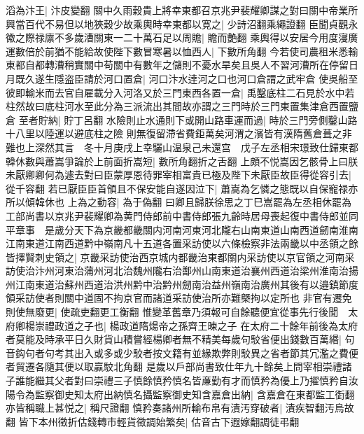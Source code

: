 滔為汴王|{
	汴皮變翻}
關中久雨穀貴上將幸東都召京兆尹裴耀卿謀之對曰關中帝業所興當百代不易但以地狹穀少故乘輿時幸東都以寛之|{
	少詩沼翻乘繩證翻}
臣聞貞觀永徽之際禄廪不多歲漕關東一二十萬石足以周贍|{
	贍而艶翻}
乘輿得以安居今用度寖廣運數倍於前猶不能給故使陛下數冒寒暑以恤西人|{
	下數所角翻}
今若使司農租米悉輸東都自都轉漕稍實關中苟關中有數年之儲則不憂水旱矣且吳人不習河漕所在停留日月既久遂生隱盗臣請於河口置倉|{
	河口汴水逹河之口也河口倉謂之武牢倉}
使吳船至彼即輸米而去官自雇載分入河洛又於三門東西各置一倉|{
	禹鑿底柱二石見於水中若柱然故曰底柱河水至此分為三派流出其間故亦謂之三門時於三門東置集津倉西置鹽倉}
至者貯納|{
	貯丁呂翻}
水險則止水通則下或開山路車運而過|{
	時於三門旁側鑿山路十八里以陸運以避底柱之險}
則無復留滯省費鉅萬矣河渭之濱皆有漢隋舊倉葺之非難也上深然其言　冬十月庚戌上幸驪山温泉己未還宫　戊子左丞相宋璟致仕歸東都　韓休數與蕭嵩爭論於上前面折嵩短|{
	數所角翻折之舌翻}
上頗不悦嵩因乞骸骨上曰朕未厭卿卿何為遽去對曰臣蒙厚恩待罪宰相富貴已極及陛下未厭臣故臣得從容引去|{
	從千容翻}
若已厭臣臣首領且不保安能自遂因泣下|{
	蕭嵩為乞憐之態既以自保寵禄亦所以傾韓休也}
上為之動容|{
	為于偽翻}
曰卿且歸朕徐思之丁巳嵩罷為左丞相休罷為工部尚書以京兆尹裴耀卿為黄門侍郎前中書侍郎張九齡時居母喪起復中書侍郎並同平章事　是歲分天下為京畿都畿關内河南河東河北隴右山南東道山南西道劒南淮南江南東道江南西道黔中嶺南凡十五道各置采訪使以六條檢察非法兩畿以中丞領之餘皆擇賢刺史領之|{
	京畿采訪使治西京城内都畿治東都關内采訪使以京官領之河南采訪使治汴州河東治蒲州河北治魏州隴右治鄯州山南東道治襄州西道治梁州淮南治揚州江南東道治蘇州西道治洪州黔中治黔州劒南治益州嶺南治廣州其後有以邉鎮節度領采訪使者則關中道固不拘京官而諸道采訪使治所亦難槩拘以定所也}
非官有遷免則使無廢更|{
	使疏吏翻更工衡翻}
惟變革舊章乃須報可自餘聽便宜從事先行後聞　太府卿楊崇禮政道之子也|{
	楊政道隋煬帝之孫齊王暕之子}
在太府二十餘年前後為太府者莫能及時承平日久財貨山積嘗經楊卿者無不精美每歲句駮省便出錢數百萬緡|{
	句音鈎句者句考其出入或多或少駮者按文籍有並緣欺弊則駮異之省者節其冗濫之費便者貿遷各隨其便以取贏駮北角翻}
是歲以戶部尚書致仕年九十餘矣上問宰相崇禮諸子誰能繼其父者對曰崇禮三子慎餘慎矜慎名皆亷勤有才而慎矜為優上乃擢慎矜自汝陽令為監察御史知太府出納慎名攝監察御史知含嘉倉出納|{
	含嘉倉在東都監工衘翻}
亦皆稱職上甚悦之|{
	稱尺證翻}
慎矜奏諸州所輸布帛有漬汚穿破者|{
	漬疾智翻汚烏故翻}
皆下本州徵折估錢轉市輕貨徵調始繁矣|{
	估音古下遐嫁翻調徒弔翻}


